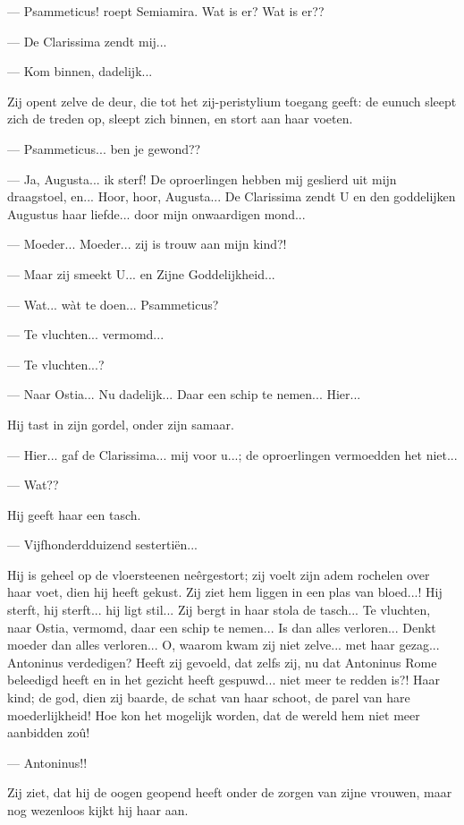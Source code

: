 \documentclass[a4paper, 12pt, oneside, dutch]{article}
\begin{document}
--- Psammeticus! roept Semiamira. Wat is er? Wat is er??

--- De Clarissima zendt mij...

--- Kom binnen, dadelijk...

Zij opent zelve de deur, die tot het zij-peristylium toegang geeft: de eunuch sleept zich de treden op, sleept zich binnen, en stort aan haar voeten.

--- Psammeticus... ben je gewond??

--- Ja, Augusta... ik sterf! De oproerlingen hebben mij geslierd uit mijn draagstoel, en... Hoor, hoor, Augusta... De Clarissima zendt U en den goddelijken Augustus haar liefde... door mijn onwaardigen mond...

--- Moeder... Moeder... zij is trouw aan mijn kind?!

--- Maar zij smeekt U... en Zijne Goddelijkheid...

--- Wat... wàt te doen... Psammeticus?

--- Te vluchten... vermomd...

--- Te vluchten...?

--- Naar Ostia... Nu dadelijk... Daar een schip te nemen... Hier...

Hij tast in zijn gordel, onder zijn samaar.

--- Hier... gaf de Clarissima... mij voor u...; de oproerlingen vermoedden het niet...

--- Wat??

Hij geeft haar een tasch.

--- Vijfhonderdduizend sestertiën...

Hij is geheel op de vloersteenen neêrgestort; zij voelt zijn adem rochelen over haar voet, dien hij heeft gekust. Zij ziet hem liggen in een plas van bloed...! Hij sterft, hij sterft... hij ligt stil... Zij bergt in haar stola de tasch... Te vluchten, naar Ostia, vermomd, daar een schip te nemen... Is dan alles verloren... Denkt moeder dan alles verloren... O, waarom kwam zij niet zelve... met haar gezag... Antoninus verdedigen? Heeft zij gevoeld, dat zelfs zij, nu dat Antoninus Rome beleedigd heeft en in het gezicht heeft gespuwd... niet meer te redden is?! Haar kind; de god, dien zij baarde, de schat van haar schoot, de parel van hare moederlijkheid! Hoe kon het mogelijk worden, dat de wereld hem niet meer aanbidden zoû!

--- Antoninus!!

Zij ziet, dat hij de oogen geopend heeft onder de zorgen van zijne vrouwen, maar nog wezenloos kijkt hij haar aan.
\end{document}
